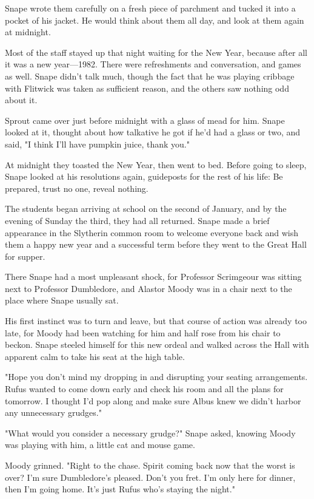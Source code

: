 Snape wrote them carefully on a fresh piece of parchment and tucked it into a pocket of his jacket. He would think about them all day, and look at them again at midnight.

Most of the staff stayed up that night waiting for the New Year, because after all it was a new year—1982. There were refreshments and conversation, and games as well. Snape didn't talk much, though the fact that he was playing cribbage with Flitwick was taken as sufficient reason, and the others saw nothing odd about it.

Sprout came over just before midnight with a glass of mead for him. Snape looked at it, thought about how talkative he got if he'd had a glass or two, and said, "I think I'll have pumpkin juice, thank you."

At midnight they toasted the New Year, then went to bed. Before going to sleep, Snape looked at his resolutions again, guideposts for the rest of his life: Be prepared, trust no one, reveal nothing.

The students began arriving at school on the second of January, and by the evening of Sunday the third, they had all returned. Snape made a brief appearance in the Slytherin common room to welcome everyone back and wish them a happy new year and a successful term before they went to the Great Hall for supper.

There Snape had a most unpleasant shock, for Professor Scrimgeour was sitting next to Professor Dumbledore, and Alastor Moody was in a chair next to the place where Snape usually sat.

His first instinct was to turn and leave, but that course of action was already too late, for Moody had been watching for him and half rose from his chair to beckon. Snape steeled himself for this new ordeal and walked across the Hall with apparent calm to take his seat at the high table.

"Hope you don't mind my dropping in and disrupting your seating arrangements. Rufus wanted to come down early and check his room and all the plans for tomorrow. I thought I'd pop along and make sure Albus knew we didn't harbor any unnecessary grudges."

"What would you consider a necessary grudge?" Snape asked, knowing Moody was playing with him, a little cat and mouse game.

Moody grinned. "Right to the chase. Spirit coming back now that the worst is over? I'm sure Dumbledore's pleased. Don't you fret. I'm only here for dinner, then I'm going home. It's just Rufus who's staying the night."

